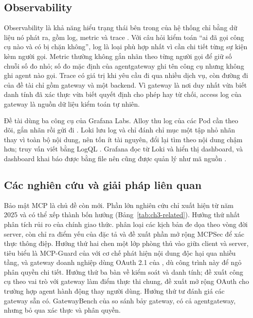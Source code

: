 \documentclass[a4paper]{article}
\begin{document}
\subsection{Observability}\label{sec:ch3-obs}

Observability là khả năng hiểu trạng thái bên trong của hệ thống chỉ bằng dữ liệu nó phát ra, gồm log, metric và trace \parencite{majors2022observability}. Với câu hỏi kiểm toán ``ai đã gọi công cụ nào và có bị chặn không'', log là loại phù hợp nhất vì cần chi tiết từng sự kiện kèm người gọi. Metric thường không gắn nhãn theo từng người gọi để giữ số chuỗi số đo nhỏ; số đo mặc định của agentgateway ghi tên công cụ nhưng không ghi agent nào gọi. Trace có giá trị khi yêu cầu đi qua nhiều dịch vụ, còn đường đi của đề tài chỉ gồm gateway và một backend. Vì gateway là nơi duy nhất vừa biết danh tính đã xác thực vừa biết quyết định cho phép hay từ chối, access log của gateway là nguồn dữ liệu kiểm toán tự nhiên.

Đề tài dùng ba công cụ của Grafana Labs. Alloy thu log của các Pod cần theo dõi, gắn nhãn rồi gửi đi \parencite{alloy_docs}. Loki lưu log và chỉ đánh chỉ mục một tập nhỏ nhãn thay vì toàn bộ nội dung, nên tốn ít tài nguyên, đổi lại tìm theo nội dung chậm hơn; truy vấn viết bằng LogQL \parencite{loki_docs}. Grafana đọc từ Loki và hiển thị dashboard, và dashboard khai báo được bằng file nên cũng được quản lý như mã nguồn \parencite{grafana_docs}.

\subsection{Các nghiên cứu và giải pháp liên quan}

Bảo mật MCP là chủ đề còn mới. Phần lớn nghiên cứu chỉ xuất hiện từ năm 2025 và có thể xếp thành bốn hướng (Bảng~\ref{tab:ch3-related}). Hướng thứ nhất phân tích rủi ro của chính giao thức. \textcite{hou2025mcp} phân loại các kịch bản đe dọa theo vòng đời server, còn \textcite{breakingmcp} chỉ ra điểm yếu của đặc tả và đề xuất phần mở rộng MCPSec để xác thực thông điệp. Hướng thứ hai chen một lớp phòng thủ vào giữa client và server, tiêu biểu là MCP-Guard của \textcite{mcpguard} với cơ chế phát hiện nội dung độc hại qua nhiều tầng, và gateway doanh nghiệp dùng OAuth 2.1 của \textcite{securemcpgw}, dù công trình này để ngỏ phân quyền chi tiết. Hướng thứ ba bàn về kiểm soát và danh tính; \textcite{securingmcp} đề xuất công cụ theo vai trò với gateway làm điểm thực thi chung, \textcite{south2025delegation} đề xuất mở rộng OAuth cho trường hợp agent hành động thay người dùng. Hướng thứ tư đánh giá các gateway sẵn có. GatewayBench của \textcite{gatewaybench} so sánh bảy gateway, có cả agentgateway, nhưng bỏ qua xác thực và phân quyền.
\end{document}
